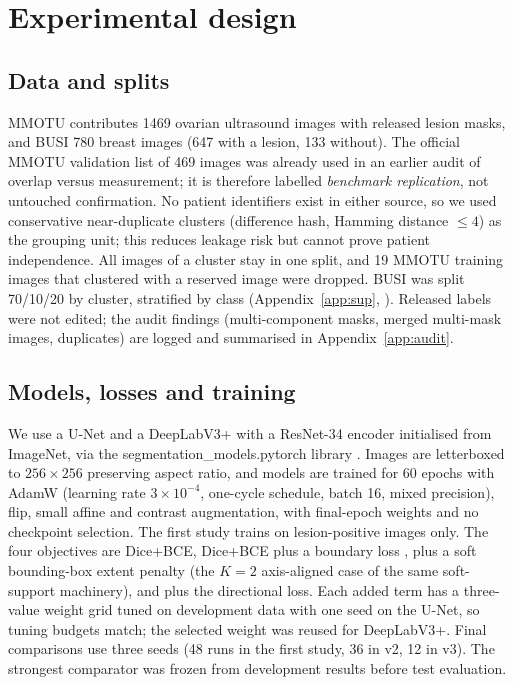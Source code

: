 \documentclass{midl}
\begin{document}
\section{Experimental design}

\subsection{Data and splits}
MMOTU \citep{zhao2022mmotu} contributes 1469 ovarian ultrasound images with released lesion masks, and BUSI \citep{aldhabyani2020busi} 780 breast images (647 with a lesion, 133 without). The official MMOTU validation list of 469 images was already used in an earlier audit of overlap versus measurement; it is therefore labelled \emph{benchmark replication}, not untouched confirmation. No patient identifiers exist in either source, so we used conservative near-duplicate clusters (difference hash, Hamming distance $\le4$) as the grouping unit; this reduces leakage risk but cannot prove patient independence. All images of a cluster stay in one split, and 19 MMOTU training images that clustered with a reserved image were dropped. BUSI was split 70/10/20 by cluster, stratified by class (Appendix~\ref{app:sup}, ). Released labels were not edited; the audit findings (multi-component masks, merged multi-mask images, duplicates) are logged and summarised in Appendix~\ref{app:audit}.

\subsection{Models, losses and training}
We use a U-Net and a DeepLabV3+ \citep{ronneberger2015unet,chen2018deeplab} with a ResNet-34 encoder \citep{he2016resnet} initialised from ImageNet, via the segmentation\_models.pytorch library \citep{iakubovskii2019smp}. Images are letterboxed to $256\times256$ preserving aspect ratio, and models are trained for 60 epochs with AdamW \citep{loshchilov2019adamw} (learning rate $3\times10^{-4}$, one-cycle schedule, batch 16, mixed precision), flip, small affine and contrast augmentation, with final-epoch weights and no checkpoint selection. The first study trains on lesion-positive images only. The four objectives are Dice+BCE, Dice+BCE plus a boundary loss \citep{kervadec2019boundary}, plus a soft bounding-box extent penalty (the $K=2$ axis-aligned case of the same soft-support machinery), and plus the directional loss. Each added term has a three-value weight grid tuned on development data with one seed on the U-Net, so tuning budgets match; the selected weight was reused for DeepLabV3+. Final comparisons use three seeds (48 runs in the first study, 36 in v2, 12 in v3). The strongest comparator was frozen from development results before test evaluation.
\end{document}
